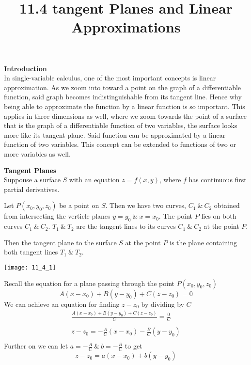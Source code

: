 \documentclass{article}
\title{11.4 tangent Planes and Linear Approximations}
\begin{document}
  \maketitle
  \textbf{Introduction}\\
  In single-variable calculus, one of the most important concepts is linear approximation. As we zoom into toward a point on the graph of a differentiable function, said graph becomes indistinguishable from its tangent line. Hence why being able to approximate the function by a linear function is so important. This applies in three dimensions as well, where we zoom towards the point of a surface that is the graph of a differentiable function of two variables, the surface looks more like its tangent plane. Said function can be approximated by a linear function of two variables. This concept can be extended to functions of two or more variables as well.

  \textbf{Tangent Planes}\\
  Suppouse a surface $ S $ with an equation $ z=f(x,y) $, where $ f $ has continuous first partial derivatives. 

  Let $ P(x_{0},y_{0},z_{0})$ be a point on $ S $. Then we have two curves, $ C_{1} ~\&~ C_{2}$ obtained from intersecting the verticle planes $ y=y_{0} ~\&~ x=x_{0}   $. The point $ P $ lies on both curves $ C_{1} ~\&~ C_{2}$. $ T_{1} ~\&~ T_{2}$ are the tangent lines to its curves $ C_{1} ~\&~ C_{2}$ at the point $ P $.  

  Then the tangent plane to the surface $ S $ at the point $ P $ is the plane containing both tangent lines $ T_{1} ~\&~ T_{2}$.  
  \begin{center}
    \texttt{[image: 11\_4\_1]}
  \end{center}

  Recall the equation for a plane passing through the point $ P(x_{0},y_{0} ,z_{0})$
  \[
    A(x-x_{0} )+B(y-y_{0} )+C(z-z_{0} )=0
  \]
  We can achieve an equation for finding $ z -z_{0} $ by dividing by $ C $
  \[
    \begin{gathered}
    \frac{A(x-x_{0} )+B(y-y_{0} )+C(z-z_{0} )}{C}=\frac{0}{C}\\
    ~\\
    z-z_{0}=-\frac{A}{C}(x-x_0)-\frac{B}{C}(y-y_{0} )\\
    \end{gathered}
  \]
  Further on we can let $ a=-\frac{A}{C} ~\&~ b=-\frac{B}{C}$ to get
  \[
    z-z_{0} =a(x-x_{0} )+b(y-y_{0} )
  \]
\end{document}
